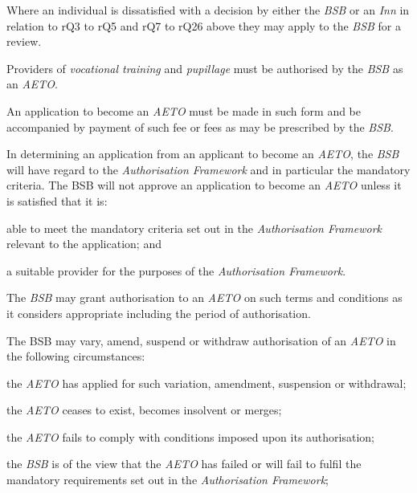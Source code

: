 
Where an individual is dissatisfied with a decision by either the
\emph{BSB} or an \emph{Inn} in relation to rQ3 to rQ5 and rQ7 to rQ26
above they may apply to the \emph{BSB} for a review.




Providers of \emph{vocational training} and \emph{pupillage} must be
authorised by the \emph{BSB} as an \emph{AETO}.


An application to become an \emph{AETO} must be made in such form and be
accompanied by payment of such fee or fees as may be prescribed by the
\emph{BSB}.


In determining an application from an applicant to become an
\emph{AETO}, the \emph{BSB} will have regard to the \emph{Authorisation
Framework} and in particular the mandatory criteria. The BSB will not
approve an application to become an \emph{AETO} unless it is satisfied
that it is:

\nl  \item able to meet the mandatory criteria set out in the
\emph{Authorisation Framework} relevant to the application; and

 \item a suitable provider for the purposes of the \emph{Authorisation
Framework}.\ln


The \emph{BSB} may grant authorisation to an \emph{AETO} on such terms
and conditions as it considers appropriate including the period of
authorisation.


The BSB may vary, amend, suspend or withdraw authorisation of an
\emph{AETO} in the following circumstances:
\nl
 \item the \emph{AETO} has applied for such variation, amendment, suspension
or withdrawal;

 \item the \emph{AETO} ceases to exist, becomes insolvent or merges;

 \item the \emph{AETO} fails to comply with conditions imposed upon its
authorisation;

 \item the \emph{BSB} is of the view that the \emph{AETO} has failed or will
fail to fulfil the mandatory requirements set out in the
\emph{Authorisation Framework};

